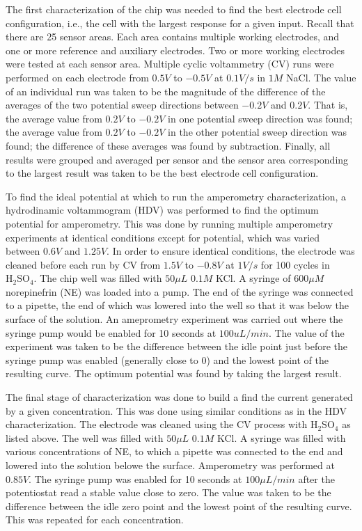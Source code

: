 \documentclass[twocolumn]{article}
\begin{document}
The first characterization of the chip was needed to find the best electrode cell configuration, i.e., the cell with the largest response for a given input. Recall that there are 25 sensor areas. Each area contains multiple working electrodes, and one or more reference and auxiliary electrodes. Two or more working electrodes were tested at each sensor area. Multiple cyclic voltammetry (CV) runs were performed on each electrode from $0.5V$ to $-0.5V$ at $0.1V/s$ in $1 M$ NaCl. The value of an individual run was taken to be the magnitude of the difference of the averages of the two potential sweep directions between $-0.2V$ and $0.2V$. That is, the average value from $0.2V$ to $-0.2V$ in one potential sweep direction was found; the average value from $0.2V$ to $-0.2V$ in the other potential sweep direction was found; the difference of these averages was found by subtraction. Finally, all results were grouped and averaged per sensor and the sensor area corresponding to the largest result was taken to be the best electrode cell configuration.

To find the ideal potential at which to run the amperometry characterization, a hydrodinamic voltammogram (HDV) was performed to find the optimum potential for amperometry. This was done by running multiple amperometry experiments at identical conditions except for potential, which was varied between $0.6V$ and $1.25V$. In order to ensure identical conditions, the electrode was cleaned before each run by CV from $1.5V$ to $-0.8V$ at $1V/s$ for 100 cycles in $\mathrm{H}_2 \mathrm{SO}_4$. The chip well was filled with $50\mu L$ $0.1M$ KCl. A syringe of $600\mu M$ norepinefrin (NE) was loaded into a pump. The end of the syringe was connected to a pipette, the end of which was lowered into the well so that it was below the surface of the solution. An ameprometry experiment was carried out where the syringe pump would be enabled for 10 seconds at $100uL/min$. The value of the experiment was taken to be the difference between the idle point just before the syringe pump was enabled (generally close to 0) and the lowest point of the resulting curve. The optimum potential was found by taking the largest result.

The final stage of characterization was done to build a find the current generated by a given concentration. This was done using similar conditions as in the HDV characterization. The electrode was cleaned using the CV process with $\mathrm{H}_2 \mathrm{SO}_4$ as listed above. The well was filled with $50\mu L$ $0.1M$ KCl. A syringe was filled with various concentrations of NE, to which a pipette was connected to the end and lowered into the solution belowe the surface. Amperometry was performed at $0.85V$. The syringe pump was enabled for 10 seconds at $100\mu L/min$ after the potentiostat read a stable value close to zero. The value was taken to be the difference between the idle zero point and the lowest point of the resulting curve. This was repeated for each concentration.
\end{document}
